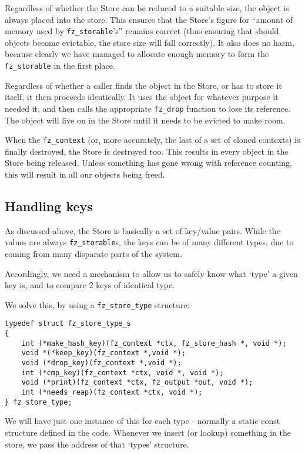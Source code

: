 \documentclass[oneside]{book}
\begin{document}
Regardless of whether the Store can be reduced to a suitable size, the object is always placed into the store. This ensures that the Store's figure for ``amount of memory used by \texttt{fz\_storable}'s'' remains correct (thus ensuring that should objects become evictable, the store size will fall correctly). It also does no harm, because clearly we have managed to allocate enough memory to form the \texttt{fz\_storable} in the first place.

Regardless of whether a caller finds the object in the Store, or has to store it itself, it then proceeds identically. It uses the object for whatever purpose it needed it, and then calls the appropriate \texttt{fz\_drop} function to lose its reference. The object will live on in the Store until it needs to be evicted to make room.

When the \texttt{fz\_context} (or, more accurately, the last of a set of cloned contexts) is finally destroyed, the Store is destroyed too. This results in every object in the Store being released. Unless something has gone wrong with reference counting, this will result in all our objects being freed.

\subsection{Handling keys}

As discussed above, the Store is basically a set of key/value pairs. While the values are always \texttt{fz\_storable}s, the keys can be of many different types, due to coming from many disparate parts of the system.

Accordingly, we need a mechanism to allow us to safely know what `type' a given key is, and to compare 2 keys of identical type.

We solve this, by using a \texttt{fz\_store\_type} structure:

\begin{lstlisting}
typedef struct fz_store_type_s
{
	int (*make_hash_key)(fz_context *ctx, fz_store_hash *, void *);
	void *(*keep_key)(fz_context *,void *);
	void (*drop_key)(fz_context *,void *);
	int (*cmp_key)(fz_context *ctx, void *, void *);
	void (*print)(fz_context *ctx, fz_output *out, void *);
	int (*needs_reap)(fz_context *ctx, void *);
} fz_store_type;
\end{lstlisting}

We will have just one instance of this for each type - normally a static const structure defined in the code. Whenever we insert (or lookup) something in the store, we pass the address of that `types' structure.
\end{document}

